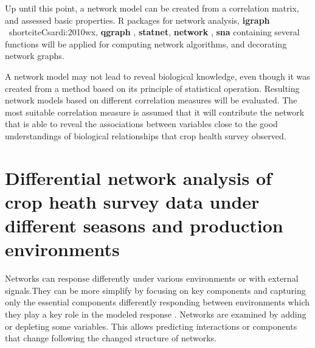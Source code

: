 Up until this point, a network model can be created from a correlation matrix, and assessed basic properties. R packages for network analysis, \textbf{igraph} \ shortcite{Csardi:2010wx}, \textbf{qgraph} , \textbf{statnet}, \textbf{network} , \textbf{sna} containing several functions will be applied for  computing  network algorithms, and decorating network graphs.

A network model may not lead to reveal biological knowledge, even though it was created from a method based on its principle of statistical operation. Resulting network models based on different correlation measures will be evaluated. The most suitable correlation measure is assumed that it will contribute the network that is able to reveal the associations between variables close to the good understandings of biological relationships that crop health survey observed.  
\section*{Differential network analysis of crop heath survey data under different seasons and production environments}

Networks can response differently under various environments or with external signals.They can be more simplify by focusing on key components and capturing only the essential components differently responding between environments which they play a key role in the modeled response . Networks are examined by adding or depleting some variables. This allows predicting interactions or components that change following the changed structure of networks. 


